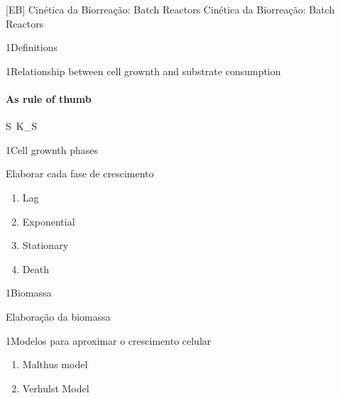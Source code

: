 \documentclass[\mainfilename]{subfiles}
\begin{document}

[EB]
{Cinética da Biorreação: Batch Reactors} %
{Cinética da Biorreação: Batch Reactors} %

\begin{sectionBox}1{Definitions} %



\end{sectionBox}

\setcounter{section}{5}
\begin{sectionBox}1{Relationship between cell grownth and substrate consumption} %

  \paragraph*{As rule of thumb}
  \begin{BM}
    S \,K_S
  \end{BM}

\end{sectionBox}

\begin{sectionBox}1{Cell grownth phases} %
    
  Elaborar cada fase de crescimento
  \begin{enumerate}
    \item Lag
    \item Exponential
    \item Stationary
    \item Death
  \end{enumerate}  
    
\end{sectionBox}

\begin{sectionBox}1{Biomassa} %
    
    Elaboração da biomassa
    
\end{sectionBox}

\begin{sectionBox}1{Modelos para aproximar o crescimento celular} %
    
  \begin{enumerate}
    \item Malthus model
    \item Verhulst Model
  \end{enumerate}
    
\end{sectionBox}
\end{document}
